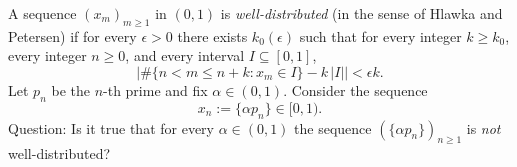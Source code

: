A sequence $(x_m)_{m\ge 1}$ in $(0,1)$ is \emph{well-distributed} (in the sense of Hlawka and Petersen) if for every $\epsilon>0$ there exists $k_0(\epsilon)$ such that for every integer $k\ge k_0$, every integer $n\ge 0$, and every interval $I\subseteq [0,1]$,
\[
\bigl|\#\{n<m\le n+k : x_m\in I\} - k\,|I|\bigr| < \epsilon k.
\]
Let $p_n$ be the $n$-th prime and fix $\alpha\in(0,1)$.  Consider the sequence
\[
 x_n := \{\alpha p_n\} \in [0,1).
\]
Question: Is it true that for every $\alpha\in(0,1)$ the sequence $(\{\alpha p_n\})_{n\ge 1}$ is \emph{not} well-distributed?
